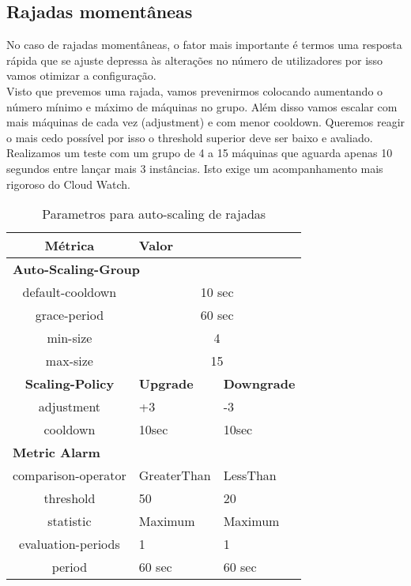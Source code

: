 \subsection{Rajadas momentâneas}
No caso de rajadas momentâneas, o fator mais importante é termos uma resposta rápida que se ajuste depressa às alterações no número de utilizadores por isso vamos otimizar a configuração.\\
Visto que prevemos uma rajada, vamos prevenirmos colocando aumentando o número mínimo e máximo de máquinas no grupo. Além disso vamos escalar com mais máquinas de cada vez (adjustment) e com menor cooldown. Queremos reagir o mais cedo possível por isso o threshold superior deve ser baixo e avaliado.\\
Realizamos um teste com um grupo de 4 a 15 máquinas que aguarda apenas 10 segundos entre lançar mais 3 instâncias. Isto exige um acompanhamento mais rigoroso do Cloud Watch.
\begin{table}[ht]
\centering
\begin{tabular}{| c | p{3cm} | p{3cm} |}
    \hline
    {\bf Métrica} & \multicolumn{2}{|l|}{ {\bf Valor}} \\ \hline
    \multicolumn{3}{|l|}{ {\bf Auto-Scaling-Group}} \\ \hline
	 default-cooldown & \multicolumn{2}{|c|}{ 10 sec }\\ \hline
	 grace-period &  \multicolumn{2}{|c|}{ 60 sec } \\ \hline

	min-size &   \multicolumn{2}{|c|}{ 4  } \\ \hline
	max-size &   \multicolumn{2}{|c|}{ 15 }\\ \hline\hline
		
	{\bf Scaling-Policy } & {\bf Upgrade } & {\bf Downgrade }  \\ \hline\hline
	
	 adjustment &  +3       & -3     \\ \hline
	 cooldown &  10sec & 10sec  \\ \hline\hline
	
	
	\multicolumn{3}{|l|}{ {\bf Metric Alarm}} \\ \hline
	 comparison-operator  &  GreaterThan & LessThan \\ \hline
	 threshold &  50  & 20 \\ \hline
	 statistic &  Maximum & Maximum \\ \hline
	 evaluation-periods  &  1 & 1 \\ \hline

	period  &   60 sec & 60 sec \\ \hline		
  \end{tabular}
\caption{Parametros para auto-scaling de rajadas}
\label{table:ParametrosRajadas} %
\end{table}



